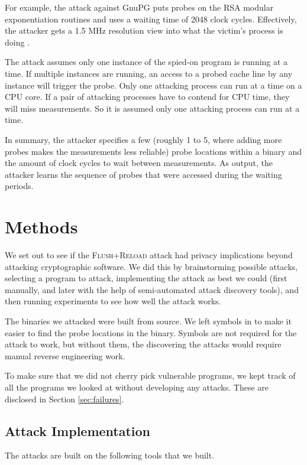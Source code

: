 \documentclass[letterpaper,twocolumn,10pt]{article}
\begin{document}
For example, the attack against GnuPG puts probes on the RSA modular
exponentiation routines and uses a waiting time of 2048 clock cycles.
Effectively, the attacker gets a 1.5 MHz resolution view into what the victim's
process is doing \cite{yarom2013flush}.

The attack assumes only one instance of the spied-on program is running at
a time. If multiple instances are running, an access to a probed cache line by
any instance will trigger the probe. Only one attacking process can run at
a time on a CPU core. If a pair of attacking processes have to contend for CPU
time, they will miss measurements. So it is assumed only one attacking process
can run at a time.

In summary, the attacker specifies a few (roughly 1 to 5, where adding more
probes makes the measurements less reliable) probe locations within a binary and
the amount of clock cycles to wait between measurements. As output, the attacker
learns the sequence of probes that were accessed during the waiting periods.

\section{Methods}
\label{sec:methods}

We set out to see if the \textsc{Flush+Reload} attack had privacy implications
beyond attacking cryptographic software. We did this by brainstorming possible
attacks, selecting a program to attack, implementing the attack as best we could
(first manually, and later with the help of semi-automated attack discovery
tools), and then running experiments to see how well the attack works.

The binaries we attacked were built from source. We left symbols in to make it
easier to find the probe locations in the binary. Symbols are not required for
the attack to work, but without them, the discovering the attacks would require
manual reverse engineering work.

To make sure that we did not cherry pick vulnerable programs, we kept track of
all the programs we looked at without developing any attacks. These are
disclosed in Section \ref{sec:failures}.

\subsection{Attack Implementation}

The attacks are built on the following tools that we built.
\end{document}
